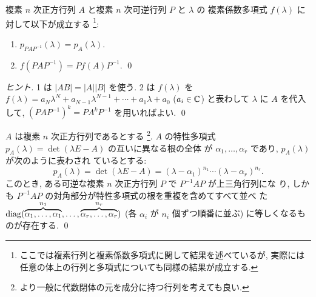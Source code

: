 \documentclass[12pt,twoside]{jarticle}
\begin{document}

\begin{question}
  \label{q:charpoly-sim}
  複素 $n$ 次正方行列 $A$ と複素 $n$ 次可逆行列 $P$ と $\lambda$ の
  複素係数多項式 $f(\lambda)$ に対して以下が成立する%
  \footnote{ここでは複素行列と複素係数多項式に関して結果を述べているが,
    実際には任意の体上の行列と多項式についても同様の結果が成立する.}:
  \begin{enumerate}
  \item $p_{PAP^{-1}}(\lambda)=p_A(\lambda)$.
  \item $f(PAP^{-1})=Pf(A)P^{-1}$.
    \qed
  \end{enumerate}
\end{question}

\begin{proof}[ヒント]
  1 は $|AB|=|A||B|$ を使う.
  2 は $f(\lambda)$ 
  を $f(\lambda)=a_N\lambda^N+a_{N-1}\lambda^{N-1}+\cdots+a_1\lambda+a_0$ 
  ($a_i\in{\mathbb C}$) と表わして $\lambda$ に $A$ を代入
  して, $(PAP^{-1})^k=PA^kP^{-1}$ を用いればよい.
  \qed
\end{proof}


\begin{question}[複素正方行列の三角化可能性]
\label{q:triangularizable2}
  $A$ は複素 $n$ 次正方行列であるとする%
  \footnote{より一般に代数閉体の元を成分に持つ行列を考えても良い.}.  %
  $A$ の特性多項式 $p_A(\lambda)=\det(\lambda E - A)$ の互いに異なる根の全体
  が $\alpha_1,\ldots,\alpha_r$ であり, $p_A(\lambda)$ が次のように表わされ
  ているとする:
  \begin{equation*}
    p_A(\lambda)=\det(\lambda E - A)
    = (\lambda-\alpha_1)^{n_1}\cdots(\lambda-\alpha_r)^{n_r}.
  \end{equation*}
  このとき, ある可逆な複素 $n$ 次正方行列 $P$ で $P^{-1}AP$ が上三角行列にな
  り, しかも $P^{-1}AP$ の対角部分が特性多項式の根を重複を含めてすべて並べ
  た $\mathop{\mathrm{diag}}\nolimits(\overbrace{\alpha_1,\dots,\alpha_1}^{n_1},\dots,
  \overbrace{\alpha_r,\dots,\alpha_r}^{n_r})$ 
  (各 $\alpha_i$ が $n_i$ 個ずつ順番に並ぶ) に等しくなるものが存在する.
  \qed
\end{question}
\end{document}
